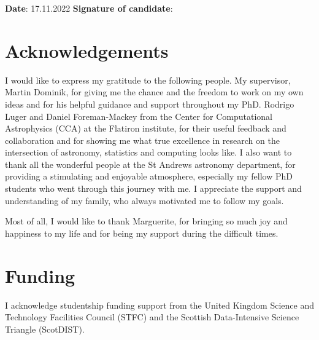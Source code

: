 \documentclass[12pt,dvipsnames]{report}
\begin{document}
\vspace{1cm}
\noindent \textbf{Date}: 17.11.2022 \quad\quad \textbf{Signature of candidate}: 
\newpage 

\section*{Acknowledgements}

I would like to express my gratitude to the following people. My supervisor, Martin Dominik, 
for giving me the chance and the freedom to work on my own ideas and for his helpful guidance and 
support throughout my PhD. Rodrigo Luger and Daniel Foreman-Mackey from the Center for Computational 
Astrophysics (CCA) at the Flatiron institute, for their useful feedback and collaboration
and for showing me what true excellence in research on the intersection of astronomy, statistics and 
computing looks like. 
I also want to thank all the wonderful people at the St Andrews astronomy department, for providing a 
stimulating and enjoyable atmosphere, especially my fellow PhD students who went through this journey 
with me. I appreciate the support and understanding of my family, who always motivated me to follow my goals.

Most of all, I would like to thank Marguerite, for bringing so much joy and happiness to my life and for being my 
support during the difficult times.

\newpage
\section*{Funding}
I acknowledge studentship funding support from the United Kingdom Science and Technology 
Facilities Council (STFC) and the Scottish Data-Intensive Science Triangle (ScotDIST).


\tableofcontents
\listoffigures
\listoftables

\end{document}
